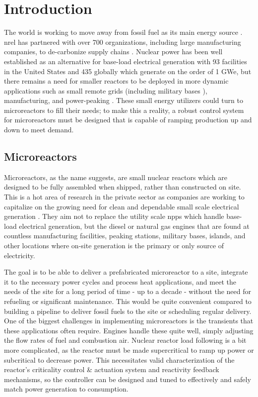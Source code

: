 \chapter{Introduction}
\label{Chapter:Introduction}
The world is working to move away from fossil fuel as its main energy source \cite{ValluriPHD}. \acf{nrel} has partnered with over 700 organizations, including large manufacturing companies, to de-carbonize supply chains \cite{NREL-partner}. Nuclear power has been well established as an alternative for base-load electrical generation with 93 facilities in the United States and 435 globally which generate on the order of 1 GWe, but there remains a need for smaller reactors to be deployed in more dynamic applications such as small remote grids (including military bases \cite{AirForce}), manufacturing, and power-peaking \cite{DoD-remote}. These small energy utilizers could turn to microreactors to fill their needs; to make this a reality, a robust control system for microreactors must be designed that is capable of ramping production up and down to meet demand.

\section{Microreactors}
Microreactors, as the name suggests, are small nuclear reactors which are designed to be fully assembled when shipped, rather than constructed on site. This is a hot area of research in the private sector as companies are working to capitalize on the growing need for clean and dependable small scale electrical generation \cite{PetersonMS}. They aim not to replace the utility scale \acfp{npp} which handle base-load electrical generation, but the diesel or natural gas engines that are found at countless manufacturing facilities, peaking stations, military bases, islands, and other locations where on-site generation is the primary or only source of electricity. 

The goal is to be able to deliver a prefabricated microreactor to a site, integrate it to the necessary power cycles and process heat applications, and meet the needs of the site for a long period of time - up to a decade - without the need for refueling or significant maintenance. This would be quite convenient compared to building a pipeline to deliver fossil fuels to the site or scheduling regular delivery. One of the biggest challenges in implementing microreactors is the transients that these applications often require. Engines handle these quite well, simply adjusting the flow rates of fuel and combustion air. Nuclear reactor load following is a bit more complicated, as the reactor must be made supercritical to ramp up power or subcritical to decrease power. This necessitates valid characterization of the reactor's criticality control \& actuation system and reactivity feedback mechanisms, so the controller can be designed and tuned to effectively and safely match power generation to consumption.

